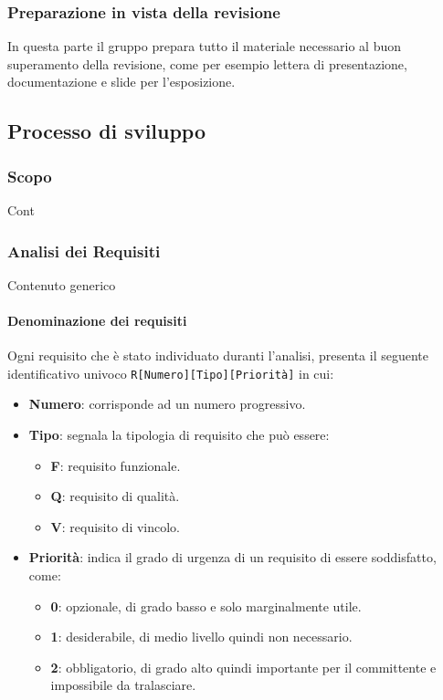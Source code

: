         \subsubsection{Preparazione in vista della revisione}
        In questa parte il gruppo prepara tutto il materiale necessario al buon superamento della revisione, come per esempio lettera di presentazione, documentazione e slide per l'esposizione.


    \subsection{Processo di sviluppo}\label{PP:Sviluppo}

        \subsubsection{Scopo}\label{PP:Sviluppo:Scopo}
        Cont


        \subsubsection{Analisi dei Requisiti}\label{PP:Sviluppo:AdR}
        Contenuto generico



		 \paragraph{Denominazione dei requisiti}\label{PP:Sviluppo:AdR:DenominazioneRequisiti}
		 Ogni requisito che è stato individuato duranti l'analisi, presenta il seguente identificativo univoco \texttt{R[Numero][Tipo][Priorità]} in cui:
		 \begin{itemize}
		 	\item \textbf{Numero}: corrisponde ad un numero progressivo.
		 	\item \textbf{Tipo}: segnala la tipologia di requisito che può essere:
		 	\begin{itemize}
		 		\item \textbf{F}: requisito funzionale.
		 		\item \textbf{Q}: requisito di qualità.
		 		\item \textbf{V}: requisito di vincolo.
		 	\end{itemize}
	 		\item \textbf{Priorità}: indica il grado di urgenza di un requisito di essere soddisfatto, come:
	 		\begin{itemize}
	 			\item \textbf{0}: opzionale, di grado basso e solo marginalmente utile.
	 			\item \textbf{1}: desiderabile, di medio livello quindi non necessario.
	 			\item \textbf{2}: obbligatorio, di grado alto quindi importante per il committente e impossibile da tralasciare.
	 		\end{itemize}
		 \end{itemize}


